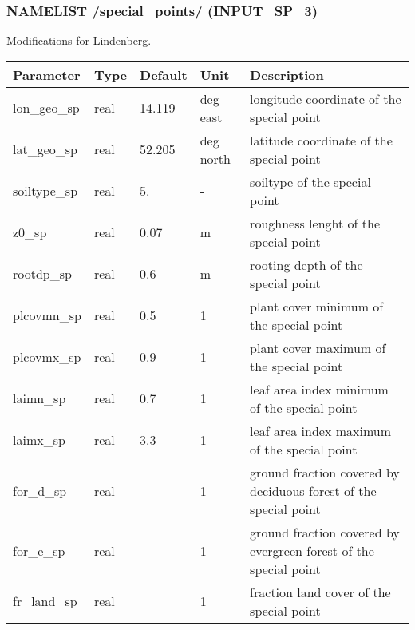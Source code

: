 \documentclass[a4paper,10pt,DIV14,BCOR1cm,titlepage,twoside]{scrartcl}
\providecommand{\tabularnewline}{\\}
\begin{document}
\subsubsection*{NAMELIST /special\_points/ (INPUT\_SP\_3)}
Modifications for Lindenberg.\\
\begin{longtable}{|p{4cm}|p{1.5cm}|p{1.5cm}|p{1cm}|p{6cm}|}
\hline 
\textbf{Parameter}& \textbf{Type}& \textbf{Default}& \textbf{Unit}& \textbf{Description}
\tabularnewline
\hline
\endhead
\hline 
lon\_geo\_sp & real & 14.119 & deg east & longitude coordinate of the special point\tabularnewline\hline
lat\_geo\_sp & real & 52.205 & deg north & latitude coordinate of the special point\tabularnewline\hline
soiltype\_sp & real & 5. & - & soiltype of the special point\tabularnewline\hline
z0\_sp & real & 0.07 & m & roughness lenght of the special point\tabularnewline\hline
rootdp\_sp & real & 0.6 & m & rooting depth of the special point\tabularnewline\hline
plcovmn\_sp & real & 0.5 & 1 & plant cover minimum of the special point\tabularnewline\hline
plcovmx\_sp & real & 0.9 & 1 &plant cover maximum of the special point\tabularnewline\hline
laimn\_sp & real & 0.7 & 1 & leaf area index minimum of the special point\tabularnewline\hline
laimx\_sp & real & 3.3 & 1 &leaf area index maximum of the special point\tabularnewline\hline
for\_d\_sp & real & & 1 & ground fraction covered by deciduous forest of the special point\tabularnewline\hline
for\_e\_sp & real & & 1 & ground fraction covered by evergreen forest of the special point\tabularnewline\hline
fr\_land\_sp & real & & 1 & fraction land cover of the special point\tabularnewline\hline
\bottomrule
\end{longtable}



\end{document}
